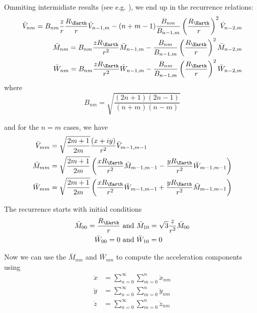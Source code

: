 Ommiting intermidiate results (see e.g. \cite{Atallah2022}), we end up in the 
recurrence relations:
\begin{equation}
  \begin{aligned}
    \bar{V}_{nm} = B_{nm} \frac{z}{r} \frac{R_{\Earth}}{r} \bar{V}_{n-1,m} 
      - (n+m-1) \frac{B_{nm}}{B_{n-1,m}} \left( \frac{R_{\Earth}}{r} \right) ^2 \bar{V}_{n-2,m} \\
    \bar{M}_{nm} = B_{nm} \frac{zR_{\Earth}}{r^2} \bar{M}_{n-1,m} 
      - \frac{B_{nm}}{B_{n-1,m}} \left( \frac{R_{\Earth}}{r} \right) ^2 \bar{M}_{n-2,m} \\
    \bar{W}_{nm} = B_{nm} \frac{zR_{\Earth}}{r^2} \bar{W}_{n-1,m} 
      - \frac{B_{nm}}{B_{n-1,m}} \left( \frac{R_{\Earth}}{r} \right) ^2 \bar{W}_{n-2,m}
  \end{aligned}
\end{equation}
where 
\begin{equation}
  B_{nm} = \sqrt{\frac{(2n+1)(2n-1)}{(n+m)(n-m)}}
\end{equation}

and for the $n=m$ cases, we have
\begin{equation}
  \begin{aligned}
    \bar{V}_{mm} &= \sqrt{\frac{2m+1}{2m}} \frac{\left(x+iy\right)}{r^2} \bar{V}_{m-1,m-1} \\
    \bar{M}_{mm} &= \sqrt{\frac{2m+1}{2m}} \left( \frac{xR_{\Earth}}{r^2} \bar{M}_{m-1,m-1} 
      - \frac{yR_{\Earth}}{r^2} \bar{W}_{m-1,m-1} \right) \\
    \bar{W}_{mm} &= \sqrt{\frac{2m+1}{2m}} \left( \frac{xR_{\Earth}}{r^2} \bar{W}_{m-1,m-1} 
      + \frac{yR_{\Earth}}{r^2} \bar{M}_{m-1,m-1} \right) \\
  \end{aligned}
\end{equation}

The recurrence starts with initial conditions
\begin{equation}
  \begin{aligned}
    \bar{M}_{00} = \frac{R_{\Earth}}{r} &\text{ and } 
      \bar{M}_{10} = \sqrt{3} \frac{z}{r^2} \bar{M}_{00} \\
    \bar{W}_{00} = 0 &\text{ and } \bar{W}_{10} = 0
  \end{aligned}
\end{equation}

Now we can use the $\bar{M}_{nm}$ and $\bar{W}_{nm}$ to compute the acceleration 
components using
\begin{equation}
  \begin{aligned}
    \ddot{x} & = \sum_{n=0}^{\infty} \sum_{m=0}^{n} \ddot{x}_{nm} \\
    \ddot{y} & = \sum_{n=0}^{\infty} \sum_{m=0}^{n} \ddot{y}_{nm} \\
    \ddot{z} & = \sum_{n=0}^{\infty} \sum_{m=0}^{n} \ddot{z}_{nm}
  \end{aligned}
\end{equation}


